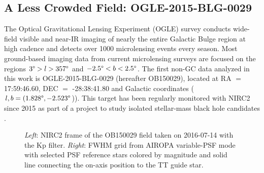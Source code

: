 \documentclass[]{spie}  %
\begin{document}

 
\subsection{A Less Crowded Field: OGLE-2015-BLG-0029} \label{sec:ogle-data}
The Optical Gravitational Lensing Experiment (OGLE) survey \cite{udalski:1992a} conducts wide-field visible and near-IR imaging of nearly the entire Galactic Bulge region at high cadence and detects over 1000 microlensing events every season. Most ground-based imaging data from current microlensing surveys are focused on the regions $3\degree > l > 357\degree$ and $-2.5\degree < b < 2.5\degree$. The first non-GC data analyzed in this work is OGLE-2015-BLG-0029 (hereafter OB150029), located at RA $=$ 17:59:46.60, DEC $=$ -28:38:41.80 and Galactic coordinates ($l,b = (1.828\degree, -2.523\degree$)). This target has been regularly monitored with NIRC2 since 2015 as part of a project to study isolated stellar-mass black hole candidates \cite{lu:inprep}.

\begin{figure}[!h]
 \caption{\footnotesize \textit{Left}: NIRC2 frame of the OB150029 field taken on 2016-07-14 with the Kp filter. \textit{Right}: FWHM grid from AIROPA variable-PSF mode with selected PSF reference stars colored by magnitude and solid line connecting the on-axis position to the TT guide star.} \label{fig:ob150029}
\end{figure}
\end{document}
